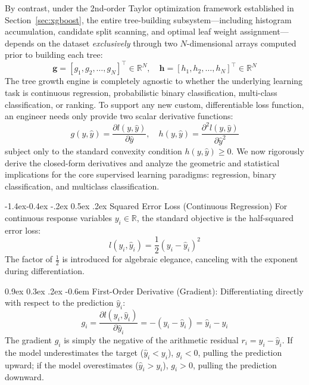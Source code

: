 \documentclass[11pt,a4paper]{article}
\makeatletter
\renewcommand\subsection{\@startsection{subsection}{2}{\z@}%
                                     {-1.4ex\@plus -0.4ex \@minus -.2ex}%
                                     {0.5ex \@plus .2ex}%
                                     {\normalfont\normalsize\bfseries}}
\renewcommand\paragraph{\@startsection{paragraph}{4}{\z@}%
                                     {0.9ex \@plus0.3ex \@minus.2ex}%
                                     {-0.6em}%
                                     {\normalfont\normalsize\bfseries}}
\newcommand{\R}{\mathbb{R}}
\makeatother
\begin{document}
By contrast, under the 2nd-order Taylor optimization framework established in Section~\ref{sec:xgboost}, the entire tree-building subsystem---including histogram accumulation, candidate split scanning, and optimal leaf weight assignment---depends on the dataset \emph{exclusively} through two $N$-dimensional arrays computed prior to building each tree:
\begin{equation}
    \mathbf{g} = [g_1, g_2, \dots, g_N]^\top \in \R^N, \quad \mathbf{h} = [h_1, h_2, \dots, h_N]^\top \in \R^N
\end{equation}
The tree growth engine is completely agnostic to whether the underlying learning task is continuous regression, probabilistic binary classification, multi-class classification, or ranking. To support any new custom, differentiable loss function, an engineer needs only provide two scalar derivative functions:
\begin{equation}
    g(y, \hat{y}) = \frac{\partial l(y, \hat{y})}{\partial \hat{y}}, \quad h(y, \hat{y}) = \frac{\partial^2 l(y, \hat{y})}{\partial \hat{y}^2}
\end{equation}
subject only to the standard convexity condition $h(y, \hat{y}) \ge 0$. We now rigorously derive the closed-form derivatives and analyze the geometric and statistical implications for the core supervised learning paradigms: regression, binary classification, and multiclass classification.

\subsection{Squared Error Loss (Continuous Regression)}
For continuous response variables $y_i \in \R$, the standard objective is the half-squared error loss:
\begin{equation}
    l(y_i, \hat{y}_i) = \frac{1}{2} (y_i - \hat{y}_i)^2
\end{equation}
The factor of $\frac{1}{2}$ is introduced for algebraic elegance, canceling with the exponent during differentiation.

\paragraph{First-Order Derivative (Gradient):}
Differentiating directly with respect to the prediction $\hat{y}_i$:
\begin{equation}
    g_i = \frac{\partial l(y_i, \hat{y}_i)}{\partial \hat{y}_i} = -(y_i - \hat{y}_i) = \hat{y}_i - y_i
\end{equation}
The gradient $g_i$ is simply the negative of the arithmetic residual $r_i = y_i - \hat{y}_i$. If the model underestimates the target ($\hat{y}_i < y_i$), $g_i < 0$, pulling the prediction upward; if the model overestimates ($\hat{y}_i > y_i$), $g_i > 0$, pulling the prediction downward.
\end{document}
